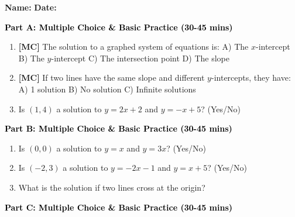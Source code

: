 \documentclass[12pt, letterpaper, fleqn]{article}
\newcommand{\blank}{\underline{\hspace{2.2cm}}}
\begin{document}
\textbf{Name:} \underline{\hspace{5cm}}
\hfill
\textbf{Date:} \underline{\hspace{3cm}}\\


\begin{tcolorbox}[colback=customteal!20]
\large\textcolor{black}{\textbf{Part A: Multiple Choice \& Basic Practice (30-45 mins)}}
\end{tcolorbox}

\vspace{3mm}

\begin{enumerate}[itemsep=2.5cm, leftmargin=0.6cm]
\item \textbf{[MC]} The solution to a graphed system of equations is:
A) The $x$-intercept B) The $y$-intercept C) The intersection point D) The slope
\item \textbf{[MC]} If two lines have the same slope and different $y$-intercepts, they have:
A) 1 solution B) No solution C) Infinite solutions
\item Is $(1, 4)$ a solution to $y = 2x + 2$ and $y = -x + 5$? (Yes/No) \blank
\end{enumerate}

\newpage

\begin{tcolorbox}[colback=customteal!20]
\large\textcolor{black}{\textbf{Part B: Multiple Choice \& Basic Practice (30-45 mins)}}
\end{tcolorbox}

\vspace{3mm}

\begin{enumerate}[itemsep=2.5cm, leftmargin=0.6cm, resume]
\item Is $(0, 0)$ a solution to $y = x$ and $y = 3x$? (Yes/No) \blank
\item Is $(-2, 3)$ a solution to $y = -2x - 1$ and $y = x + 5$? (Yes/No) \blank
\item What is the solution if two lines cross at the origin? \blank
\end{enumerate}

\newpage

\begin{tcolorbox}[colback=customteal!20]
\large\textcolor{black}{\textbf{Part C: Multiple Choice \& Basic Practice (30-45 mins)}}
\end{tcolorbox}
\end{document}
